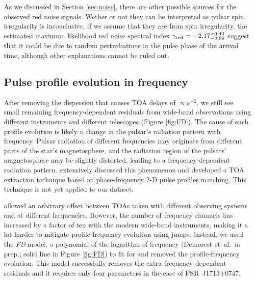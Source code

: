 As we discussed in Section \ref{sec:noise}, there are other possible
sources for the observed red noise signals.
Wether or not they can be interpreted as pulsar spin irregularity is inconclusive.
If we assume that they are from spin irregularity, 
the estimated maximum likelihood red noise spectral index 
$\gamma_{\rm red} = -2.17^{+0.44}_{-0.09}$ suggest that it could be due to
random perturbations in the pulse phase of the arrival time, although other
explanations cannot be ruled out.




\subsection{Pulse profile evolution in frequency}
\label{sec:FD}
After removing the dispersion that causes TOA delays of $\propto \nu^{-2}$,
 we still see small remaining frequency-dependent residuals from wide-band
observations using
different instruments and different telescopes (Figure \ref{fig:FD}).  
The cause of such profile evolution is likely a change in the pulsar's
radiation pattern with frequency.  Pulsar radiation of different frequencies may originate from
different parts of the star's magnetosphere, and 
the radiation region of the pulsars' magnetosphere may be slightly distorted,
leading to a frequency-dependent radiation pattern. \citet{pdr14} 
extensively discussed this phenomenon and developed a TOA extraction technique
based on phase-frequency 2-D pulse profiles matching. This technique is not
yet applied to our dataset.

\citet{sns+05} allowed an arbitrary offset between TOAs taken with different
observing systems and at different frequencies.
However, the number of frequency
channels has increased by a factor of ten with the modern wide-band
instruments, making it a lot harder to mitigate profile-frequency evolution using jumps. 
Instead, we used the {\it FD} model, a polynomial of the logarithm of
frequency (Demorest et~al.\ in prep.; solid line in Figure
\ref{fig:FD}) to fit for and removed the profile-frequency
evolution. This model successfully removes the extra
frequency-dependent residuals and it requires only four parameters in the
case of PSR~J1713+0747.


